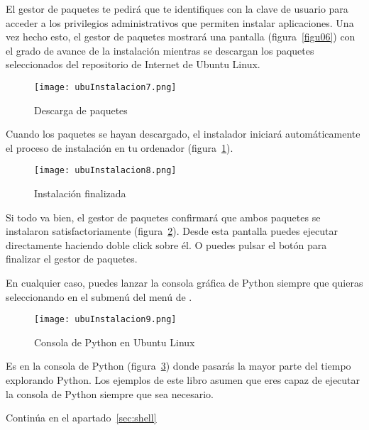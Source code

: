 El gestor de paquetes te pedirá que te identifiques con la clave de usuario para acceder a los privilegios administrativos que permiten instalar aplicaciones. Una vez hecho esto, el gestor de paquetes mostrará una pantalla (figura~\ref{figu06}) con el grado de avance de la instalación mientras se descargan los paquetes seleccionados del repositorio de Internet de Ubuntu Linux.

\begin{figure}[!h]
  \begin{center}
\texttt{[image: ubuInstalacion7.png]}
\caption{Descarga de paquetes}\label{figu07}
  \end{center}
\end{figure}

Cuando los paquetes se hayan descargado, el instalador iniciará automáticamente el proceso de instalación en tu ordenador (figura~\ref{figu07}).

\begin{figure}[!h]
  \begin{center}
\texttt{[image: ubuInstalacion8.png]}
\caption{Instalación finalizada}\label{figu08}
  \end{center}
\end{figure}

Si todo va bien, el gestor de paquetes confirmará que ambos paquetes se instalaron satisfactoriamente (figura~\ref{figu08}). Desde esta pantalla puedes ejecutar directamente  haciendo doble click sobre él. O puedes pulsar el botón  para finalizar el gestor de paquetes.

En cualquier caso, puedes lanzar la consola gráfica de Python siempre que quieras seleccionando  en el submenú  del menú de .

\begin{figure}[!h]
  \begin{center}
\texttt{[image: ubuInstalacion9.png]}
\caption{Consola de Python en Ubuntu Linux}\label{figu09}
  \end{center}
\end{figure}

Es en la consola de Python (figura~\ref{figu09}) donde pasarás la mayor parte del tiempo explorando Python. Los ejemplos de este libro asumen que eres capaz de ejecutar la consola de Python siempre que sea necesario.

Continúa en el apartado~\ref{sec:shell}


